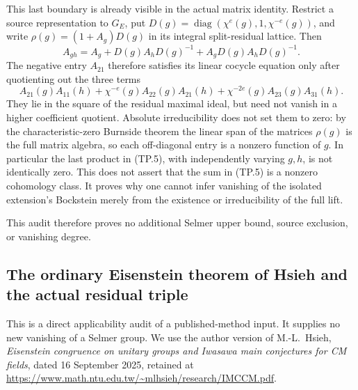 \documentclass[11pt,a4paper]{article}
\theoremstyle{definition}
\begin{document}
This last boundary is already visible in the actual matrix
identity.  Restrict a source representation to \(G_E\), put
\(D(g)=\operatorname{diag}(\chi^e(g),1,\chi^{-e}(g))\),
and write \(\rho(g)=(1+A_g)D(g)\) in its integral
split-residual lattice.  Then
\[
 A_{gh}=A_g+D(g)A_hD(g)^{-1}
                    +A_gD(g)A_hD(g)^{-1}.
 \tag{TP.4}
\]
The negative entry \(A_{21}\) therefore satisfies its
linear cocycle equation only after quotienting out the
three terms
\[
 A_{21}(g)A_{11}(h)
 +\chi^{-e}(g)A_{22}(g)A_{21}(h)
 +\chi^{-2e}(g)A_{23}(g)A_{31}(h).
 \tag{TP.5}
\]
They lie in the square of the residual maximal ideal,
but need not vanish in a higher coefficient quotient.
Absolute irreducibility does not set them to zero:
by the characteristic-zero Burnside theorem the linear
span of the matrices \(\rho(g)\) is the full matrix
algebra, so each off-diagonal entry is a nonzero
function of \(g\).  In particular the last product
in (TP.5), with independently varying \(g,h\), is
not identically zero.  This does not assert that
the sum in (TP.5) is a nonzero cohomology class.
It proves why one cannot infer vanishing of the
isolated extension's Bockstein merely from the
existence or irreducibility of the full lift.

This audit therefore proves no additional Selmer
upper bound, source exclusion, or vanishing degree.



\subsection{The ordinary Eisenstein theorem of Hsieh and the actual residual triple}
\label{sec:kt-hsieh-unitary-scope}

This is a direct applicability audit of a published-method input.
It supplies no new vanishing of a Selmer group.  We use the author
version of M.-L.~Hsieh, \emph{Eisenstein congruence on unitary groups
and Iwasawa main conjectures for CM fields}, dated
16 September 2025, retained at
\url{https://www.math.ntu.edu.tw/~mlhsieh/research/IMCCM.pdf}.
\end{document}
